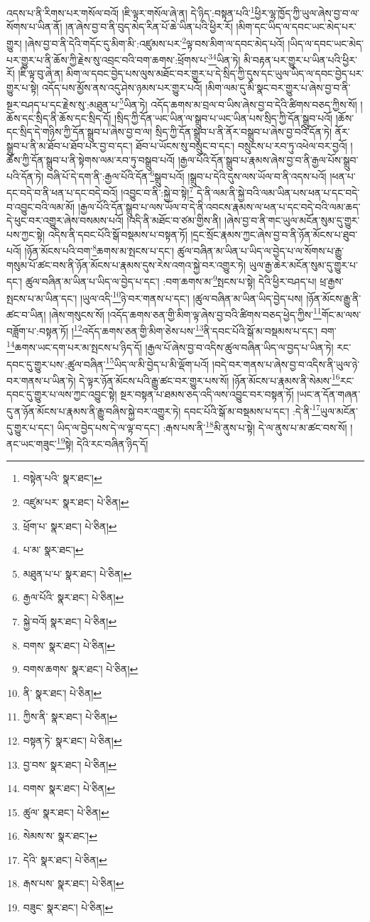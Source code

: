 འདས་པ་ནི་རིགས་པར་གསོལ་བའོ། །ཇི་ལྟར་གསོལ་ཞེ་ན། དེ་ཉིད་:བསྟན་པའི་\footnote{བསྟེན་པའི་  སྣར་ཐང་། }ཕྱིར་ལྷ་ཁྱོད་ཀྱི་ཡུལ་ཞེས་བྱ་བ་ལ་སོགས་པ་ཡིན་ནོ། །ན་ཞེས་བྱ་བ་ནི་བུད་མེད་རིན་པོ་ཆེ་ཡིན་པའི་ཕྱིར་རོ། །མིག་དང་ཡིད་ལ་དབང་ཡང་མེད་པར་གྱུར། །ཞེས་བྱ་བ་ནི་དེའི་གདོང་དུ་མིག་མི་:འཛུམས་པར་\footnote{འཛུམ་པར་  སྣར་ཐང་།  པེ་ཅིན། }ལྟ་བས་མིག་ལ་དབང་མེད་པའོ། །ཡིད་ལ་དབང་ཡང་མེད་པར་གྱུར་པ་ནི་ཆོས་ཀྱི་རྗེས་སུ་འབྲང་བའི་བག་ཆགས་:ཕྲོགས་པ་\footnote{ཕྲོག་པ་  སྣར་ཐང་།  པེ་ཅིན། }\footnote{པ་མ་  སྣར་ཐང་། }ཡིན་ཏེ། མི་བརྟན་པར་གྱུར་པ་ཡིན་པའི་ཕྱིར་རོ། །ཇི་ལྟ་བུ་ཞེ་ན། མིག་ལ་དབང་བྱེད་པས་ལུས་མཐོང་བར་གྱུར་པ་དེ་སྲིད་ཀྱི་དུས་དང་ཡུལ་ཡིད་ལ་དབང་བྱེད་པར་གྱུར་པ་སྟེ། འདོད་པས་མྱོས་ནས་འདུ་ཤེས་ཉམས་པར་གྱུར་པའོ། །མིག་ལམ་དུ་མི་སྣང་བར་གྱུར་པ་ཞེས་བྱ་བ་ནི་སྔར་བཤད་པ་དང་རྗེས་སུ་:མཐུན་པ་\footnote{མཐུན་པ་པ་  སྣར་ཐང་།  པེ་ཅིན། }ཡིན་ཏེ། འདོད་ཆགས་མ་བྲལ་བ་ཡིས་ཞེས་བྱ་བ་དེའི་ཚིགས་བཅད་ཀྱིས་སོ། །ཆོས་དང་སྲིད་ནི་ཆོས་དང་སྲིད་དོ། །སྲིད་ཀྱི་དོན་ཡང་ཡིན་ལ་སྒྲུབ་པ་ཡང་ཡིན་པས་སྲིད་ཀྱི་དོན་སྒྲུབ་པའོ། །ཆོས་དང་སྲིད་དེ་གཉིས་ཀྱི་དོན་སྒྲུབ་པ་ཞེས་བྱ་བ་ལ། སྲིད་ཀྱི་དོན་སྒྲུབ་པ་ནི་ནོར་བསྒྲུབ་པ་ཞེས་བྱ་བའི་དོན་ཏེ། ནོར་སྒྲུབ་པ་ནི་མ་ཐོབ་པ་ཐོབ་པར་བྱ་བ་དང་། ཐོབ་པ་ཡོངས་སུ་བསྲུང་བ་དང་། བསྲུངས་པ་རབ་ཏུ་འཕེལ་བར་བྱའོ། །ཆོས་ཀྱི་དོན་སྒྲུབ་པ་ནི་སྟེགས་ལམ་རབ་ཏུ་བསྒྲུབ་པའོ། །རྒྱལ་པོའི་དོན་སྒྲུབ་པ་རྣམས་ཞེས་བྱ་བ་ནི་རྒྱལ་པོས་སྒྲུབ་པའི་དོན་ཏེ། བཞི་པོ་དེ་དག་ནི་:རྒྱལ་པོའི་དོན་\footnote{རྒྱལ་པོའི་  སྣར་ཐང་།  པེ་ཅིན། }སྒྲུབ་པའོ། །སྒྲུབ་པ་དེའི་དུས་ལས་ཡོལ་བ་ནི་འདས་པའོ། །ཕན་པ་དང་བདེ་བ་ནི་ཕན་པ་དང་བདེ་བའོ། །འབྱུང་བ་ནི་:སྐྱེ་བ་སྟེ།\footnote{སྐྱེ་བའོ།  སྣར་ཐང་།  པེ་ཅིན། } དེ་ནི་ལམ་ནི་སྐྱེ་བའི་ལམ་ཡིན་པས་ཕན་པ་དང་བདེ་བ་འབྱུང་བའི་ལམ་མོ། །རྒྱལ་པོའི་དོན་སྒྲུབ་པ་ལས་ཡོལ་བ་དེ་ནི་འབངས་རྣམས་ལ་ཕན་པ་དང་བདེ་བའི་ལམ་ཆད་དེ་ཕུང་བར་འགྱུར་ཞེས་བསམས་པའོ། །འདི་ནི་མཐོང་བ་ཙམ་གྱིས་ནི། །ཞེས་བྱ་བ་ནི་གང་ཡུལ་མངོན་སུམ་དུ་གྱུར་པས་ཀྱང་སྟེ། འདིས་ནི་དབང་པོའི་སྒོ་བསྡམས་པ་བསྟན་ཏོ། །དྲང་སྲོང་རྣམས་ཀྱང་ཞེས་བྱ་བ་ནི་ཉོན་མོངས་པ་ཐུབ་པའོ། །ཉོན་མོངས་པའི་བག་\footnote{བགས་  སྣར་ཐང་།  པེ་ཅིན། }ཆགས་མ་སྤངས་པ་དང་། ཚུལ་བཞིན་མ་ཡིན་པ་ཡིད་ལ་བྱེད་པ་ལ་སོགས་པ་རྒྱུ་གསུམ་པོ་ཚང་བས་ནི་ཉོན་མོངས་པ་རྣམས་དུས་རེས་འགའ་སྐྱེ་བར་འགྱུར་ཏེ། ཡུལ་རྒྱ་ཆེར་མངོན་སུམ་དུ་གྱུར་པ་དང་། ཚུལ་བཞིན་མ་ཡིན་པ་ཡིད་ལ་བྱེད་པ་དང་། :བག་ཆགས་མ་\footnote{བགས་ཆགས་  སྣར་ཐང་།  པེ་ཅིན། }སྤངས་པ་སྟེ། དེའི་ཕྱིར་བཤད་པ། ཕྲ་རྒྱས་སྤངས་པ་མ་ཡིན་དང་། །ཡུལ་འདི་\footnote{ནི་  སྣར་ཐང་།  པེ་ཅིན། }ཉེ་བར་གནས་པ་དང་། །ཚུལ་བཞིན་མ་ཡིན་ཡིད་བྱེད་པས། །ཉོན་མོངས་རྒྱུ་ནི་ཚང་བ་ཡིན། །ཞེས་གསུངས་སོ། །འདོད་ཆགས་ཅན་གྱི་མིག་ལྟ་ཞེས་བྱ་བའི་ཚིགས་བཅད་ཕྱེད་ཀྱིས་\footnote{ཀྱིས་ནི་  སྣར་ཐང་།  པེ་ཅིན། }གོང་མ་ལས་བཟློག་པ་:བསྟན་ཏོ། །\footnote{བསྟན་ཏེ་  སྣར་ཐང་།  པེ་ཅིན། }འདོད་ཆགས་ཅན་གྱི་མིག་ཅེས་པས་\footnote{བྱ་བས་  སྣར་ཐང་།  པེ་ཅིན། }ནི་དབང་པོའི་སྒོ་མ་བསྡམས་པ་དང་། བག་\footnote{བགས་  སྣར་ཐང་།  པེ་ཅིན། }ཆགས་ཡང་དག་པར་མ་སྤངས་པ་ཉིད་དོ། །རྒྱལ་པོ་ཞེས་བྱ་བ་འདིས་ཚུལ་བཞིན་ཡིད་ལ་བྱད་པ་ཡིན་ཏེ། རང་དབང་དུ་གྱུར་པས་:ཚུལ་བཞིན་\footnote{ཚུལ་  སྣར་ཐང་།  པེ་ཅིན། }ཡིད་ལ་མི་བྱེད་པ་མི་ལྡོག་པའོ། །བདེ་བར་གནས་པ་ཞེས་བྱ་བ་འདིས་ནི་ཡུལ་ཉེ་བར་གནས་པ་ཡིན་ཏེ། དེ་ལྟར་ཉོན་མོངས་པའི་རྒྱུ་ཚང་བར་གྱུར་པས་སོ། །ཉོན་མོངས་པ་རྣམས་ནི་སེམས་\footnote{སེམས་ས་  སྣར་ཐང་། }རང་དབང་དུ་གྱུར་པ་ལས་ཀྱང་འབྱུང་སྟེ། སྔར་བསྟན་པ་ཐམས་ཅད་འདི་ལས་འབྱུང་བར་བསྟན་ཏོ། །ཡང་ན་དོན་གཞན་དུ་ན་ཉོན་མོངས་པ་རྣམས་ནི་རྒྱུ་བཞིས་སྐྱེ་བར་འགྱུར་ཏེ། དབང་པོའི་སྒོ་མ་བསྡམས་པ་དང་། :དེ་ནི་\footnote{དེའི་  སྣར་ཐང་།  པེ་ཅིན། }ཡུལ་མངོན་དུ་གྱུར་པ་དང་། ཡིད་ལ་བྱེད་པས་དེ་ལ་ལྟ་བ་དང་། :རྒས་པས་ནི་\footnote{རྒས་པས་  སྣར་ཐང་།  པེ་ཅིན། }མི་ནུས་པ་སྟེ། དེ་ལ་ནུས་པ་མ་ཚང་བས་སོ། །ནང་ཡང་གཟུང་\footnote{བཟུང་  སྣར་ཐང་།  པེ་ཅིན། }སྟེ། དེའི་རང་བཞིན་ཉིད་དོ། 